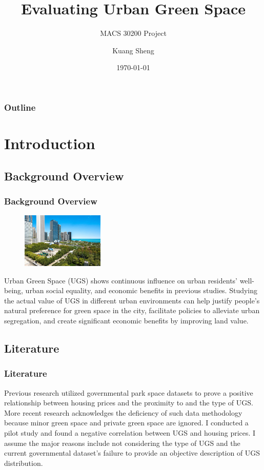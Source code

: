 \documentclass{beamer}
\title{Evaluating Urban Green Space}
\subtitle{MACS 30200 Project}
\author{Kuang Sheng}
\institute{University of Chicago}
\date{\today}
\begin{document}
\begin{frame}
\titlepage
\end{frame}

\begin{frame}
\frametitle{Outline}
\tableofcontents
\end{frame}

\section{Introduction}
\subsection{Background Overview}

\begin{frame}
\frametitle{Background Overview}
\begin{figure}[h]
  \centering
  \includegraphics[width=0.35\textwidth]{Visual/MPark.jpg}
\end{figure}
Urban Green Space (UGS) shows continuous influence on urban residents’ \alert{well-being, urban social equality, and economic benefits} in previous studies. Studying the actual value of UGS in different urban environments can help justify people’s natural preference for green space in the city, facilitate policies to alleviate urban segregation, and create significant economic benefits by improving land value.
\end{frame}

\subsection{Literature}

\begin{frame}
\frametitle{Literature}
Previous research utilized governmental park space datasets to prove a positive relationship between housing prices and the proximity to and the type of UGS. More recent research acknowledges the deficiency of such data methodology because \alert{minor green space} and \alert{private green space} are ignored. I conducted a pilot study and found a negative correlation between UGS and housing prices. I assume the major reasons include not considering the type of UGS and the current governmental dataset's failure to provide an objective description of UGS distribution.
\end{frame}
\end{document}
